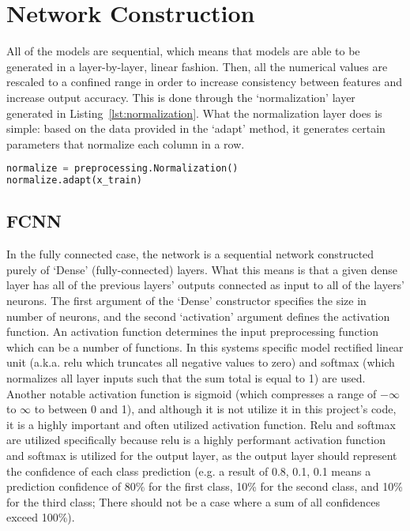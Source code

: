 \documentclass[12pt,letterpaper,oneside,reqno]{book}
\theoremstyle{plain}
\theoremstyle{definition}
\theoremstyle{plain}
\theoremstyle{remark}
\theoremstyle{plain}
\theoremstyle{definition}
\theoremstyle{plain}
\begin{document}
\section{Network Construction}
\label{NCNorm}
All of the models are sequential, which means that models are able to be generated in a layer-by-layer, linear fashion. Then, all the numerical values are rescaled to a confined range in order to increase consistency between features and increase output accuracy. This is done through the `normalization' layer generated in Listing~\ref{lst:normalization}. What the normalization layer does is simple: based on the data provided in the `adapt' method, it generates certain parameters that normalize each column in a row.


\begin{lstlisting}[language=Python, caption={Normalization Layer Construction Code}, label = lst:normalization, frame=single]
normalize = preprocessing.Normalization()
normalize.adapt(x_train)
\end{lstlisting}



\subsection{FCNN}
In the fully connected case, the network is a sequential network constructed purely of `Dense' (fully-connected) layers. What this means is that a given dense layer has all of the previous layers' outputs connected as input to all of the layers' neurons. The first argument of the `Dense' constructor specifies the size in number of neurons, and the second `activation' argument defines the activation function. An activation function determines the input preprocessing function which can be a number of functions. In this systems specific model rectified linear unit (a.k.a. relu which truncates all negative values to zero) and softmax (which normalizes all layer inputs such that the sum total is equal to 1) are used. Another notable activation function is sigmoid (which compresses a range of $-\infty$ to $\infty$ to between 0 and 1), and although it is not utilize it in this project's code, it is a highly important and often utilized activation function. Relu and softmax are utilized specifically because relu is a highly performant activation function and softmax is utilized for the output layer, as the output layer should represent the confidence of each class prediction (e.g. a result of 0.8, 0.1, 0.1 means a prediction confidence of 80\% for the first class, 10\% for the second class, and 10\% for the third class; There should not be a case where a sum of all confidences exceed 100\%).
\end{document}
